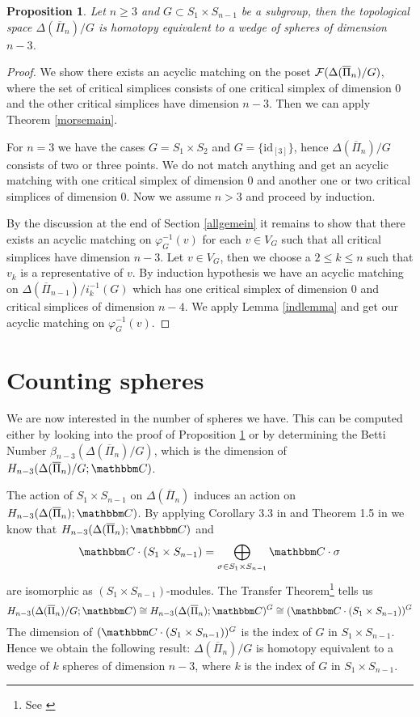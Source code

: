 \documentclass{elsarticle}
\newtheorem{prop}[df]{Proposition}
\def\id{\textrm{id}}
\def\C{\mathbbm C}
\begin{document}
\begin{prop}
\label{rdthm}
Let $n\geq3$ and $G\subset S_1\times S_{n-1}$ be a subgroup, then the topological space $\Delta(\overline{\Pi}_n)/G$ is homotopy equivalent to a wedge of spheres of dimension $n-3$.
\end{prop}
\begin{proof}
We show there exists an acyclic matching on the poset ${\cal F}(\Delta(\overline{\Pi}_n)/G)$, where the set of critical simplices consists of one critical simplex of dimension $0$ and the other critical simplices have dimension $n-3$. Then we can apply Theorem \ref{morsemain}.

For $n=3$ we have the cases $G=S_1\times S_2$ and $G=\{\id_{[3]}\}$, hence $\Delta(\overline{\Pi}_n)/G$ consists of two or three points. We do not match anything and get an acyclic matching with one critical simplex of dimension $0$ and another one or two critical simplices of dimension $0$. Now we assume $n>3$ and proceed by induction.

By the discussion at the end of Section \ref{allgemein} it remains to show that there exists an acyclic matching on $\varphi_G^{-1}(v)$ for each $v\in V_G$ such that all critical simplices have dimension $n-3$. Let $v\in V_G$, then we choose a $2\leq k\leq n$ such that $v_k$ is a representative of $v$. By induction hypothesis we have an acyclic matching on $\Delta(\overline{\Pi}_{n-1})/i_k^{-1}(G)$ which has one critical simplex of dimension $0$ and critical simplices of dimension $n-4$. We apply Lemma \ref{indlemma} and get our acyclic matching on $\varphi_G^{-1}(v)$.
\end{proof}
\section{Counting spheres}
\label{giacomo}
We are now interested in the number of spheres we have. This can be computed either by looking into the proof of Proposition \ref{rdthm} or by determining the Betti Number $\beta_{n-3}(\Delta(\overline{\Pi}_n)/G)$, which is the dimension of $H_{n-3}(\Delta(\overline{\Pi}_n)/G;\C)$.

The action of $S_1\times S_{n-1}$ on $\Delta(\overline{\Pi}_n)$ induces an action on $H_{n-3}(\Delta(\overline{\Pi}_n);\C)$. By applying Corollary 3.3 in \cite{emk} and Theorem 1.5 in \cite{white} we know that $H_{n-3}(\Delta(\overline{\Pi}_n);\C)$ and
\[\C\cdot(S_1\times S_{n-1})=\bigoplus_{\sigma\in S_1\times S_{n-1}}\C\cdot\sigma\]
are isomorphic as $(S_1\times S_{n-1})$-modules. The Transfer Theorem\footnote{See \cite{transfer}} tells us
\[
H_{n-3}(\Delta(\overline{\Pi}_n)/G;\C)\cong H_{n-3}(\Delta(\overline{\Pi}_n);\C)^G\cong(\C\cdot(S_1\times S_{n-1}))^G
\]
The dimension of $(\C\cdot(S_1\times S_{n-1}))^G$ is the index of $G$ in $S_1\times S_{n-1}$. Hence we obtain the following result: $\Delta(\overline{\Pi}_n)/G$ is homotopy equivalent to a wedge of $k$ spheres of dimension $n-3$, where $k$ is the index of $G$ in $S_1\times S_{n-1}$.
\end{document}
